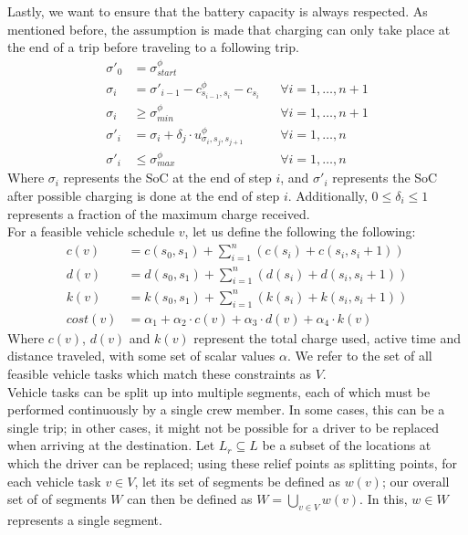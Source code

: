 \documentclass[]{article}
\begin{document}
Lastly, we want to ensure that the battery capacity is always respected. As mentioned before, the assumption is made that charging can only take place at the end of a trip before traveling to a following trip.
\begin{align}
  \sigma'_0 &= \sigma^\phi_{start} \\
  \sigma_{i} &= \sigma'_{i-1} - c^\phi_{s_{i-1}, s_{i}} - c_{s_{i}} && \forall i = 1, \dots, n + 1 \\
  \sigma_{i} &\geq \sigma^\phi_{min} && \forall i = 1, \dots, n + 1 \\
  \sigma'_{i} &= \sigma_{i} + \delta_j \cdot u^\phi_{\sigma_{i},s_{j}, s_{j+1}} && \forall i = 1, \dots, n \\
  \sigma'_{i} &\leq \sigma^\phi_{max} && \forall i = 1, \dots, n
\end{align}
Where $\sigma_i$ represents the SoC at the end of step $i$, and $\sigma'_i$ represents the SoC after possible charging is done at the end of step $i$. Additionally, $0 \leq \delta_i \leq 1$ represents a fraction of the maximum charge received. \\
For a feasible vehicle schedule $v$, let us define the following the following:
\begin{align}
  c(v) &= c(s_0, s_1) + \sum^{n}_{i = 1}(c(s_i) + c(s_i, s_i + 1))  \\
  d(v) &= d(s_0, s_1) + \sum^{n}_{i = 1}(d(s_i) + d(s_i, s_i + 1))  \\
  k(v) &= k(s_0, s_1) + \sum^{n}_{i = 1}(k(s_i) + k(s_i, s_i + 1))  \\
  cost(v) &= \alpha_1 + \alpha_2 \cdot c(v) + \alpha_3 \cdot d(v) + \alpha_4 \cdot k(v) 
\end{align}
Where $c(v)$, $d(v)$ and $k(v)$ represent the total charge used, active time and distance traveled, with some set of scalar values $\alpha$. We refer to the set of all feasible vehicle tasks which match these constraints as $V$. \\
Vehicle tasks can be split up into multiple segments, each of which must be performed continuously by a single crew member. In some cases, this can be a single trip; in other cases, it might not be possible for a driver to be replaced when arriving at the destination. Let $L_r \subseteq L$ be a subset of the locations at which the driver can be replaced; using these relief points as splitting points, for each vehicle task $v \in V$, let its set of segments be defined as $w(v)$; our overall set of of segments $W$ can then be defined as $W = \bigcup_{v \in V}w(v)$. In this, $w \in W$ represents a single segment. \\\\
\end{document}
